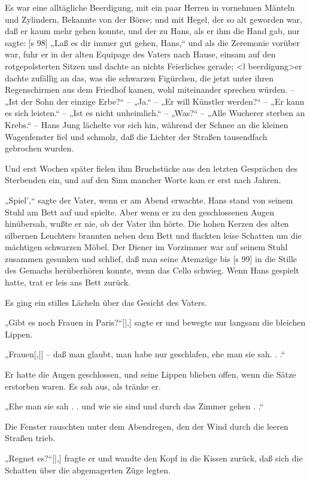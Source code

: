 Es war eine alltägliche Beerdigung, mit ein
paar Herren in vornehmen Mänteln und Zylindern,
Bekannte von der Börse; und mit Hegel, der so alt
geworden war, daß er kaum mehr gehen konnte,
und der zu Hans, als er ihm die Hand gab, nur sagte:
[s 98]
„Laß es dir immer gut gehen, Hans,“ und als die
Zeremonie vorüber war, fuhr er in der alten Equipage
des Vaters nach Hause, einsam auf den rotgepolsterten
Sitzen und dachte an nichts Feierliches gerade; <l beerdigung>er
dachte zufällig an das, was die schwarzen Figürchen,
die jetzt unter ihren Regenschirmen aus dem Friedhof
kamen, wohl miteinander sprechen würden. – „Ist
der Sohn der einzige Erbe?“ – „Ja.“ – „Er will
Künstler werden?“ – „Er kann es sich leisten.“ –
„Ist es nicht unheimlich.“ – „Was?“ – „Alle
Wucherer sterben an Krebs.“ – Hans Jung lächelte
vor sich hin, während der Schnee an die kleinen
Wagenfenster fiel und schmolz, daß die Lichter der
Straßen tausendfach gebrochen wurden.

Und erst Wochen später fielen ihm Bruchstücke
aus den letzten Gesprächen des Sterbenden ein, und
auf den Sinn mancher Worte kam er erst nach Jahren.

„Spiel',“ sagte der Vater, wenn er am Abend
erwachte. Hans stand von seinem Stuhl am Bett
auf und spielte. Aber wenn er zu den geschlossenen
Augen hinübersah, wußte er nie, ob der Vater ihn
hörte. Die hohen Kerzen des alten silbernen Leuchters
brannten neben dem Bett und flackten leise Schatten
um die mächtigen schwarzen Möbel. Der Diener
im Vorzimmer war auf seinem Stuhl zusammen­
gesunken und schlief, daß man seine Atemzüge bis
[s 99]
in die Stille des Gemachs herüberhören konnte, wenn
das Cello schwieg. Wenn Hans gespielt hatte, trat er
leis ans Bett zurück.

Es ging ein stilles Lächeln über das Gesicht
des Vaters.

„Gibt es noch Frauen in Paris?“[|,] sagte er und
bewegte nur langsam die bleichen Lippen.

„Frauen[,|] – daß man glaubt, man habe nur
geschlafen, ehe man sie sah. . .“

Er hatte die Augen geschlossen, und seine Lippen
blieben offen, wenn die Sätze erstorben waren. Es
sah aus, als tränke er.

„Ehe man sie sah . . und wie sie sind und durch
das Zimmer gehen . .“

Die Fenster rauschten unter dem Abendregen,
den der Wind durch die leeren Straßen trieb.

„Regnet es?“[|,] fragte er und wandte den Kopf
in die Kissen zurück, daß sich die Schatten über die
abgemagerten Züge legten.

